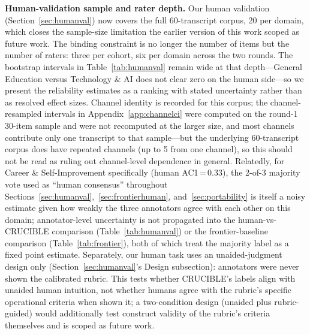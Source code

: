 \documentclass[11pt]{article}
\begin{document}
\textbf{Human-validation sample and rater depth.} Our human validation
(Section~\ref{sec:humanval}) now covers the full 60-transcript corpus, 20
per domain, which closes the sample-size limitation the earlier version of
this work scoped as future work. The binding constraint is no longer the
number of items but the number of raters: three per cohort, six per
domain across the two rounds. The bootstrap intervals in
Table~\ref{tab:humanval} remain wide at that depth---General Education
versus Technology \& AI does not clear zero on the human side---so we
present the reliability estimates as a ranking with stated uncertainty
rather than as resolved effect sizes. Channel identity is recorded for
this corpus; the channel-resampled intervals in
Appendix~\ref{app:channelci} were computed on the round-1 30-item sample
and were not recomputed at the larger size, and most channels contribute
only one transcript to that sample---but the underlying 60-transcript
corpus does have repeated channels (up to 5 from one channel), so this
should not be read as ruling out channel-level dependence in general. Relatedly, for Career \& Self-Improvement specifically (human
AC1\,=\,0.33), the 2-of-3 majority vote used as ``human consensus''
throughout Sections~\ref{sec:humanval},~\ref{sec:frontierhuman},
and~\ref{sec:portability} is itself a noisy estimate given how weakly the
three annotators agree with each other on this domain; annotator-level
uncertainty is not propagated into the human-vs-CRUCIBLE comparison
(Table~\ref{tab:humanval}) or the frontier-baseline comparison
(Table~\ref{tab:frontier}), both of which treat the majority label as a
fixed point estimate. Separately, our human task uses an unaided-judgment
design only (Section~\ref{sec:humanval}'s Design subsection): annotators
were never shown the calibrated rubric. This tests whether CRUCIBLE's
labels align with unaided human intuition, not whether humans agree with
the rubric's specific operational criteria when shown it; a two-condition
design (unaided plus rubric-guided) would additionally test construct
validity of the rubric's criteria themselves and is scoped as future work.
\end{document}
